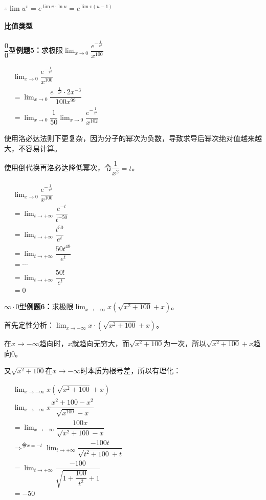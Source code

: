 \documentclass[UTF8]{ctexart}
\begin{document}
$\therefore \lim u^v=e^{\lim v\cdot\ln u}=e^{\lim v(u-1)}$

\paragraph{比值类型} \leavevmode \bigskip

$\dfrac{0}{0}$型\textbf{例题5：}求极限$\lim_{x\to 0}\dfrac{e^{-\frac{1}{x^2}}}{x^{100}}$

$
\begin{aligned}
    & \lim_{x\to 0}\dfrac{e^{-\frac{1}{x^2}}}{x^{100}} \\
    & = \lim_{x\to 0}\dfrac{e^{-\frac{1}{x^2}}\cdot 2x^{-3}}{100x^99} \\
    & = \lim_{x\to 0}\dfrac{1}{50}\lim_{x\to 0}\dfrac{e^{-\frac{1}{x^2}}}{x^{102}}
\end{aligned}
$

\bigskip

使用洛必达法则下更复杂，因为分子的幂次为负数，导致求导后幂次绝对值越来越大，不容易计算。

使用倒代换再洛必达降低幂次，令$\dfrac{1}{x^2}=t$。

$
\begin{aligned}
    & \lim_{x\to 0}\dfrac{e^{-\frac{1}{x^2}}}{x^{100}} \\
    & = \lim_{t\to+\infty}\dfrac{e^{-t}}{t^{-50}} \\
    & = \lim_{t\to+\infty}\dfrac{t^{50}}{e^t} \\
    & = \lim_{t\to+\infty}\dfrac{50t^{49}}{e^t} \\
    & = \cdots \\
    & = \lim_{t\to+\infty}\dfrac{50!}{e^t} \\
    & = 0
\end{aligned}
$

$\infty\cdot 0$型\textbf{例题6：}求极限$\lim_{x\to-\infty}x(\sqrt{x^2+100}+x)$。

首先定性分析：$\lim_{x\to-\infty}x\cdot(\sqrt{x^2+100}+x)$。

在$x\to-\infty$趋向时，$x$就趋向无穷大，而$\sqrt{x^2+100}$为一次，所以$\sqrt{x^2+100}+x$趋向0。

又$\sqrt{x^2+100}$在$x\to-\infty$时本质为根号差，所以有理化：

$
\begin{aligned}
    & \lim_{x\to-\infty}x(\sqrt{x^2+100}+x) \\
    & \lim_{x\to-\infty}x\dfrac{x^2+100-x^2}{\sqrt{x^100}-x} \\
    & = \lim_{x\to-\infty}\dfrac{100x}{\sqrt{x^2+100}-x} \\
    & \Rightarrow^{\text{令}x=-t} \lim_{t\to+\infty}\dfrac{-100t}{\sqrt{t^2+100}+t} \\
    & = \lim_{t\to+\infty}\dfrac{-100}{\sqrt{1+\dfrac{100}{t^2}}+1} \\
    & = -50
\end{aligned}
$
\end{document}

